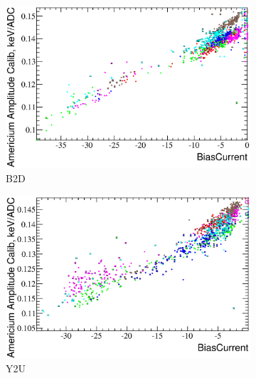\documentclass[a4paper,12pt]{article}
\begin{document}
\begin{figure}[p]
\begin{subfigure}[b]{0.5\textwidth}
\includegraphics[width=\textwidth]{gfx/run13_alpha_study/B2D/c_hBiasCurrent_AmGain.eps}
\caption{B2D}\label{bc_vs_gain-b2d}
\end{subfigure}
\begin{subfigure}[b]{0.5\textwidth}
\includegraphics[width=\textwidth]{gfx/run13_alpha_study/Y2U/c_hBiasCurrent_AmGain.eps}
\caption{Y2U}\label{bc_vs_gain-y2u}
\end{subfigure}

\caption{\bcvsgainlabel}
\label{fig:bc_vs_gain}
\end{figure}
\end{document}
